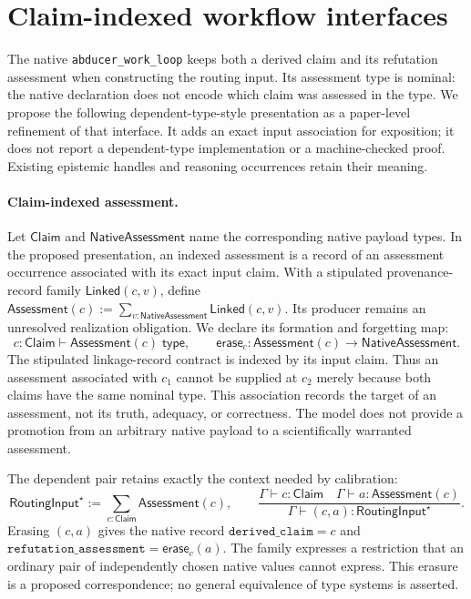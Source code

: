 \section{Claim-indexed workflow interfaces}
\label{app:dependent-workflow}
The native \texttt{abducer\_work\_loop} keeps both a derived claim and its
refutation assessment when constructing the routing input. Its assessment type
is nominal: the native declaration does not encode which claim was assessed
in the type. We propose the following dependent-type-style presentation as a
paper-level refinement of that interface. It adds an exact input association
for exposition; it does not report a dependent-type implementation or a
machine-checked proof. Existing epistemic handles and reasoning occurrences
retain their meaning.

\paragraph{Claim-indexed assessment.}
Let $\mathsf{Claim}$ and $\mathsf{NativeAssessment}$ name the corresponding
native payload types. In the proposed presentation, an indexed assessment is
a record of an assessment occurrence associated with its exact input claim.
With a stipulated provenance-record family $\mathsf{Linked}(c,v)$, define $\mathsf{Assessment}(c):=\sum_{v:\mathsf{NativeAssessment}}\mathsf{Linked}(c,v)$. Its producer remains an unresolved realization obligation. We declare its formation and forgetting map:
\[
 c:\mathsf{Claim}\vdash\mathsf{Assessment}(c)\;\mathsf{type},\qquad
 \mathsf{erase}_c:\mathsf{Assessment}(c)\to\mathsf{NativeAssessment}.
\]
The stipulated linkage-record contract is indexed by its input claim. Thus an assessment associated
with $c_1$ cannot be supplied at $c_2$ merely because both claims have the same
nominal type. This association records the target of an assessment, not its
truth, adequacy, or correctness. The model does not provide a promotion from
an arbitrary native payload to a scientifically warranted assessment.

The dependent pair retains exactly the context needed by calibration:
\[
 \mathsf{RoutingInput}^{\star}
   :=\sum_{c:\mathsf{Claim}}\mathsf{Assessment}(c),\qquad
 \frac{\Gamma\vdash c:\mathsf{Claim}\quad
       \Gamma\vdash a:\mathsf{Assessment}(c)}
      {\Gamma\vdash(c,a):\mathsf{RoutingInput}^{\star}}.
\]
Erasing $(c,a)$ gives the native record
$\texttt{derived\_claim}=c$ and
$\texttt{refutation\_assessment}=\mathsf{erase}_c(a)$.
The family expresses a restriction that an ordinary pair of independently
chosen native values cannot express. This erasure is a proposed correspondence;
no general equivalence of type systems is asserted.

